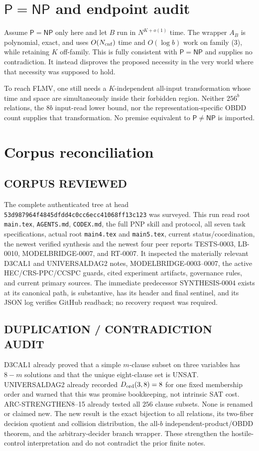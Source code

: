 \documentclass[11pt]{article}
\begin{document}
\section{$\mathsf P=\mathsf{NP}$ and endpoint audit}

Assume $\mathsf P=\mathsf{NP}$ only here and let $B$ run in
$N^{K+o(1)}$ time.  The wrapper $A_B$ is polynomial, exact, and uses
$O(N_{\rm cnf})$ time and $O(\log b)$ work on family (3), while retaining
$K$ off-family.  This is fully consistent with $\mathsf P=\mathsf{NP}$ and
supplies no contradiction.  It instead disproves the proposed necessity in
the very world where that necessity was supposed to hold.

To reach FLMV, one still needs a $K$-independent all-input transformation
whose time and space are simultaneously inside their forbidden region.
Neither $256^b$ relations, the $8b$ input-read lower bound, nor the
representation-specific OBDD count supplies that transformation.  No
premise equivalent to $\mathsf P\ne\mathsf{NP}$ is imported.

\section{Corpus reconciliation}

\subsection*{CORPUS REVIEWED}
The complete authenticated tree at head
\texttt{53d987964f4845dfdd4c0cc6ecc41068ff13c123} was surveyed.  This run
read root \texttt{main.tex}, \texttt{AGENTS.md}, \texttt{CODEX.md}, the full
PNP skill and protocol, all seven task specifications, actual root
\texttt{main4.tex} and \texttt{main5.tex}, current status/coordination, the
newest verified synthesis and the newest four peer reports
TESTS-0003, LB-0010, MODELBRIDGE-0007, and RT-0007.  It inspected the
materially relevant D3CAL1 and UNIVERSALDAG2 notes, MODELBRIDGE-0003--0007,
the active HEC/CRS-PPC/CCSPC guards, cited experiment artifacts, governance
rules, and current primary sources.  The immediate predecessor
SYNTHESIS-0004 exists at its canonical path, is substantive, has its header
and final sentinel, and its JSON log verifies GitHub readback; no recovery
request was required.

\subsection*{DUPLICATION / CONTRADICTION AUDIT}
D3CAL1 already proved that a simple $m$-clause subset on three variables has
$8-m$ solutions and that the unique eight-clause set is UNSAT.
UNIVERSALDAG2 already recorded $D_{\rm ord}(3,8)=8$ for one fixed membership
order and warned that this was promise bookkeeping, not intrinsic SAT cost.
ARC-STRENGTHEN8--15 already tested all $256$ clause subsets.  None is renamed
or claimed new.  The new result is the exact bijection to all relations, its
two-fiber decision quotient and collision distribution, the all-$b$
independent-product/OBDD theorem, and the arbitrary-decider branch wrapper.
These strengthen the hostile-control interpretation and do not contradict
the prior finite notes.
\end{document}
